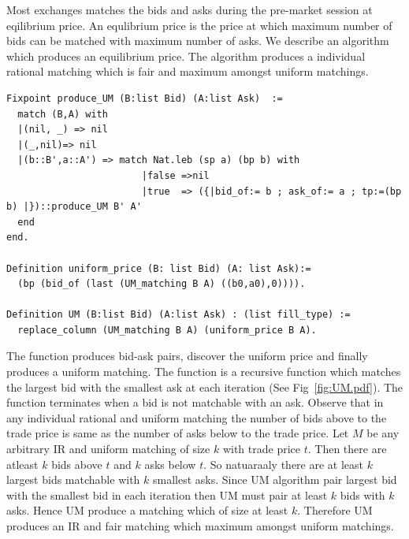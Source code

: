 \documentclass[a4paper,UKenglish,cleveref, autoref]{lipics-v2019}
\begin{document}
Most exchanges matches the bids and asks during the pre-market session at eqilibrium price.  An equlibrium price is the price at which maximum number of bids can be matched with maximum number of asks. We describe an algorithm which produces an equilibrium price. The algorithm  produces a individual rational matching which is fair and maximum amongst uniform matchings.

\begin{verbatim}
Fixpoint produce_UM (B:list Bid) (A:list Ask)  :=
  match (B,A) with
  |(nil, _) => nil
  |(_,nil)=> nil
  |(b::B',a::A') => match Nat.leb (sp a) (bp b) with
                        |false =>nil
                        |true  => ({|bid_of:= b ; ask_of:= a ; tp:=(bp b) |})::produce_UM B' A'
  end
end.

Definition uniform_price (B: list Bid) (A: list Ask):=
  (bp (bid_of (last (UM_matching B A) ((b0,a0),0)))).

Definition UM (B:list Bid) (A:list Ask) : (list fill_type) :=
  replace_column (UM_matching B A) (uniform_price B A).

\end{verbatim}


The function  produces bid-ask pairs,  discover the uniform price and finally  produces a uniform matching. The function  is a recursive function which matches the largest bid with the smallest ask at each iteration (See Fig~\ref{fig:UM.pdf}). The function terminates when a bid is not matchable with an ask. Observe that in any individual rational and uniform matching the number of bids above to the trade price is same as the number of asks below to the trade price. Let $M$ be any arbitrary IR and uniform matching of size $k$ with trade price $t$. Then there are atleast $k$ bids above $t$ and $k$ asks below $t$. So natuaraaly there are at least $k$ largest bids matchable with $k$ smallest asks. Since UM algorithm pair largest bid with the smallest bid in each iteration then UM must pair at least $k$ bids with $k$ asks. Hence UM produce a matching which of size at least $k$. Therefore UM produces an IR and fair matching which maximum amongst uniform matchings. 

\begin{theorem}
\end{theorem}
\end{document}
